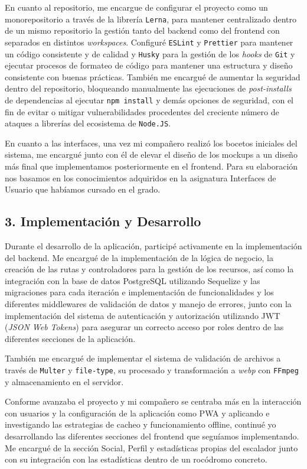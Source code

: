 En cuanto al repositorio, me encargue de configurar el proyecto como un monorepositorio a través de la librería \texttt{Lerna}, para mantener centralizado dentro de un mismo repositorio la gestión tanto del backend como del frontend con separados en distintos \textit{workspaces}. Configuré \texttt{ESLint} y \texttt{Prettier} para mantener un código consistente y de calidad y \texttt{Husky} para la gestión de los \textit{hooks} de \texttt{Git} y ejecutar procesos de formateo de código para mantener una estructura y diseño consistente con buenas prácticas. También me encargué de aumentar la seguridad dentro del repositorio, bloqueando manualmente las ejecuciones de \textit{post-installs} de dependencias al ejecutar \texttt{npm install} y demás opciones de seguridad, con el fin de evitar o mitigar vulnerabilidades procedentes del creciente número de ataques a librerías del ecosistema de \texttt{Node.JS}.

En cuanto a las interfaces, una vez mi compañero realizó los bocetos iniciales del sistema, me encargué junto con él de elevar el diseño de los mockups a un diseño más final que implementamos posteriormente en el frontend. Para su elaboración nos basamos en los conocimientos adquiridos en la asignatura Interfaces de Usuario que habíamos cursado en el grado.

\subsection*{3. Implementación y Desarrollo}

Durante el desarrollo de la aplicación, participé activamente en la implementación del backend. Me encargué de la implementación de la lógica de negocio, la creación de las rutas y controladores para la gestión de los recursos, así como la integración con la base de datos PostgreSQL utilizando Sequelize y las migraciones para cada iteración e implementación de funcionalidades y los diferentes middlewares de validación de datos y manejo de errores, junto con la implementación del sistema de autenticación y autorización utilizando JWT (\textit{JSON Web Tokens}) para asegurar un correcto acceso por roles dentro de las diferentes secciones de la aplicación. 

También me encargué de implementar el sistema de validación de archivos a través de \texttt{Multer} y \texttt{file-type}, su procesado y transformación a \textit{webp} con \texttt{FFmpeg} y almacenamiento en el servidor.

Conforme avanzaba el proyecto y mi compañero se centraba más en la interacción con usuarios y la configuración de la aplicación como PWA y aplicando e investigando las estrategias de cacheo y funcionamiento offline, continué yo desarrollando las diferentes secciones del frontend que seguíamos implementando. Me encargué de la sección Social, Perfil y estadísticas propias del escalador junto con su integración con las estadísticas dentro de un rocódromo concreto.

